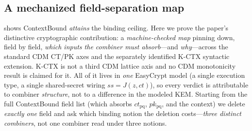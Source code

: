 \documentclass[journal]{IEEEtran}
\begin{document}
\subsection{A mechanized field-separation map}\label{sec:sep}
 shows ContextBound \emph{attains} the binding ceiling. Here we prove the paper's
distinctive cryptographic contribution: a \emph{machine-checked map} pinning down, field by field,
\emph{which inputs the combiner must absorb}---and \emph{why}---across the standard CDM CT/PK axes
and the separately identified K-CTX syntactic extension. K-CTX is not a third CDM lattice axis and
no CDM monotonicity result is claimed for it. All of it lives in \emph{one} EasyCrypt model (a single
execution type, a single shared-secret wiring $ss=J(z,ct)$), so every verdict is attributable to
combiner \emph{structure}, not to a difference in the modeled KEM. Starting from the full ContextBound
field list (which absorbs $ct_{\mathrm{pq}}$, $pk_{\mathrm{pq}}$, and the context) we delete
\emph{exactly one} field and ask which binding notion the deletion costs---\emph{three distinct
combiners}, not one combiner read under three notions.
\end{document}
